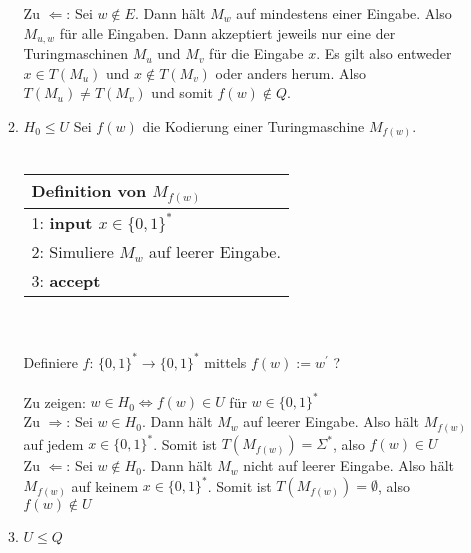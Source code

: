 \documentclass[12pt]{scrartcl}
\begin{document}
\begin{enumerate}
\begin{enumerate}
               Zu $\Leftarrow$: Sei $w \notin E$. Dann hält $M_w$ auf mindestens einer Eingabe. Also
               $M_{u,w}$ für alle Eingaben. Dann akzeptiert jeweils nur eine der Turingmaschinen $M_u$ und 
               $M_v$ für die Eingabe $x$. Es gilt also entweder $x \in T(M_u)$ und $x \notin T(M_v)$ oder anders herum.
               Also $T(M_u) \neq T(M_v)$ und somit $f(w) \notin Q$.
        \item $H_0 \leq U$
              Sei $f(w)$ die Kodierung einer Turingmaschine $M_{f(w)}$.\\\\
              \begin{tabular}[h!]{l}
                \hline
                Definition von $M_{f(w)}$\\\hline
                1: \textbf{input $x \in \{0,1\}^*$}\\
                2: Simuliere $M_{w}$ auf leerer Eingabe.\\
                3: \textbf{accept}\\\hline
              \end{tabular}\\\\
              Definiere $f: \, \{0,1\}^* \rightarrow \{0,1\}^*$ mittels $f(w) := w^{'}$ ?\\\\
              Zu zeigen: $w \in H_0 \Longleftrightarrow f(w) \in U $ für $w \in \{0,1\}^*$\\
              Zu $\Rightarrow$: Sei $w \in H_0$. Dann hält $M_{w}$ auf leerer Eingabe. Also hält $M_{f(w)}$ auf jedem $x \in \{0,1\}^*$.
              Somit ist $T(M_{f(w)}) = \Sigma^*$, also $f(w) \in U$\\

              Zu $\Leftarrow$: Sei $w \notin H_0$. Dann hält $M_{w}$ nicht auf leerer Eingabe. Also hält $M_{f(w)}$ auf keinem $x \in \{0,1\}^*$.
              Somit ist $T(M_{f(w)}) = \emptyset$, also $f(w) \notin U$\\
        \item $U \leq Q$\\
              
    \end{enumerate}
\end{enumerate}
\end{document}
